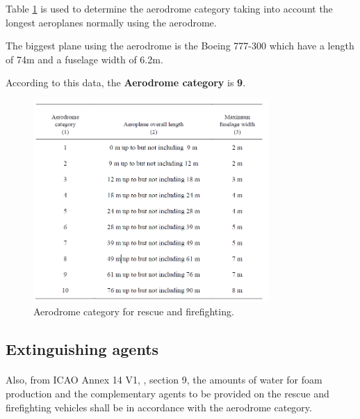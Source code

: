 		Table \ref{table91} is used to determine the aerodrome category taking into account the longest aeroplanes normally using the aerodrome.
		
		The biggest plane using the aerodrome is the Boeing 777-300 which have a length of 74m and a fuselage width of 6.2m.
		
		According to this data, the \textbf{Aerodrome category} is \textbf{9}.
		
		\begin{figure}[H]
			\centering
			\includegraphics[clip, trim=0cm 0cm 0cm 0cm, width=0.8\textwidth]{./images/firefighting/table91}
			\caption{Aerodrome category for rescue and firefighting.}
			\label{table91}
		\end{figure}
	
		\subsection{Extinguishing agents}
		\paragraph{} Also, from ICAO Annex 14 V1, \cite{Standards2016}, section 9, the amounts of water for foam production and the complementary agents to be provided on the rescue and firefighting vehicles shall be in accordance with the aerodrome category.
		
